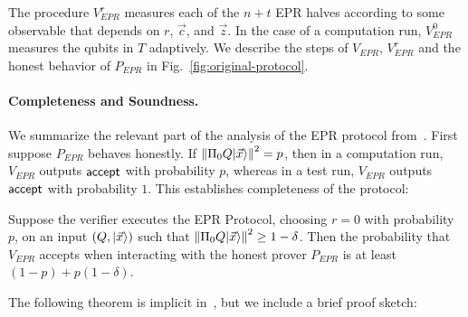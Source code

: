 The procedure $V_{EPR}^r$ measures each of the $n+t$ EPR halves according to
some observable that depends on $r$, $\vec{c}$, and $\vec{z}$. In the case of a
computation run, $V_{EPR}^0$ measures the qubits in $T$ adaptively.  We
describe the steps of $V_{EPR}$, $V_{EPR}^r$ and the honest behavior of
$P_{EPR}$ in Fig.~\ref{fig:original-protocol}.

\paragraph{Completeness and Soundness.} 
We summarize the relevant part of the analysis of the EPR protocol from~\cite{broadbent15howtoverify}. First suppose $P_{EPR}$ behaves honestly. If $\left\|\Pi_0 Q|\vec{x}\rangle\right\|^2=p$, then in a computation run, $V_{EPR}$ outputs $\sf accept$ with probability $p$, whereas in a test run, $V_{EPR}$ outputs $\sf accept$ with probability $1$. This establishes completeness of the protocol:

\begin{theorem}[Completeness]\label{thm:EPR-correctness} 
Suppose the verifier executes the EPR Protocol, choosing $r=0$ with probability $p$, on an input $(Q,|\vec{x}\rangle)$ such that $\left\|\Pi_0 Q|\vec{x}\rangle\right\|^2\geq 1-\delta$. Then the probability that $V_{EPR}$ accepts when interacting with the honest prover $P_{EPR}$ is at least $(1-p)+p(1-\delta)$. 
\end{theorem}

The following theorem is implicit in~\cite[Section 7.6]{broadbent15howtoverify}, but we include a brief proof sketch:

